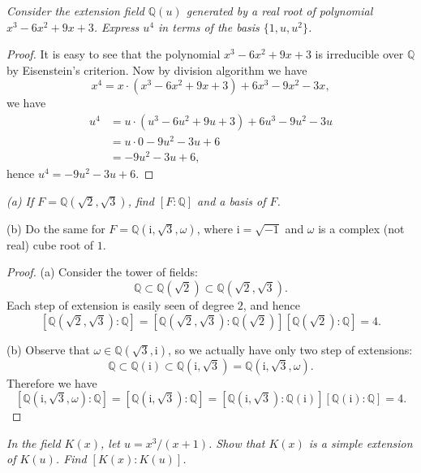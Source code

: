 \begin{problem}\em
Consider the extension field $\mathbb{Q}(u)$ generated by a real root of polynomial $x^3-6x^2+9x+3$. Express $u^4$ in terms of the basis $\{1,u,u^2\}$.
\end{problem}
\begin{proof}
It is easy to see that the polynomial $x^3-6x^2+9x+3$ is irreducible over $\mathbb{Q}$ by Eisenstein's criterion. Now by division algorithm we have 
$$
x^4=x\cdot \left( x^3-6x^2+9x+3 \right) +6x^3-9x^2-3x,
$$
we have 
$$
\begin{aligned}
u^4&=u\cdot \left( u^3-6u^2+9u+3 \right) +6u^3-9u^2-3u
\\
&=u\cdot 0-9u^2-3u+6
\\
&=-9u^2-3u+6,
\end{aligned}
$$
hence $u^4=-9u^2-3u+6$.
\end{proof}
\begin{problem}\em
(a) If $F=\mathbb{Q}(\sqrt{2},\sqrt{3})$, find $[F:\mathbb{Q}]$ and a basis of $F$.\par
(b) Do the same for $F=\mathbb{Q}(\mathrm{i},\sqrt{3},\omega)$, where $\mathrm{i}=\sqrt{-1}$ and $\omega$ is a complex (not real) cube root of $1$.
\end{problem}
\begin{proof}
(a) Consider the tower of fields: 
$$
\mathbb{Q} \subset \mathbb{Q} \left( \sqrt{2} \right) \subset \mathbb{Q} \left( \sqrt{2},\sqrt{3} \right) .
$$
Each step of extension is easily seen of degree $2$, and hence 
$$
\left[ \mathbb{Q} \left( \sqrt{2},\sqrt{3} \right) :\mathbb{Q} \right] =\left[ \mathbb{Q} \left( \sqrt{2},\sqrt{3} \right) :\mathbb{Q} \left( \sqrt{2} \right) \right] \left[ \mathbb{Q} \left( \sqrt{2} \right) :\mathbb{Q} \right] =4.
$$\par
(b) Observe that $\omega\in\mathbb{Q}(\sqrt{3},\mathrm{i})$, so we actually have only two step of extensions: 
$$
\mathbb{Q} \subset \mathbb{Q} \left( \mathrm{i} \right) \subset \mathbb{Q} \left( \mathrm{i},\sqrt{3} \right) =\mathbb{Q} \left( \mathrm{i},\sqrt{3},\omega \right) .
$$
Therefore we have 
$$
\left[ \mathbb{Q} \left( \mathrm{i},\sqrt{3},\omega \right) :\mathbb{Q} \right] =\left[ \mathbb{Q} \left( \mathrm{i},\sqrt{3} \right) :\mathbb{Q} \right] =\left[ \mathbb{Q} \left( \mathrm{i},\sqrt{3} \right) :\mathbb{Q} \left( \mathrm{i} \right) \right] \left[ \mathbb{Q} \left( \mathrm{i} \right) :\mathbb{Q} \right] =4.
$$
\end{proof}
\begin{problem}\em
In the field $K(x)$, let $u=x^3/(x+1)$. Show that $K(x)$ is a simple extension of $K(u)$. Find $[K(x):K(u)]$.
\end{problem}
